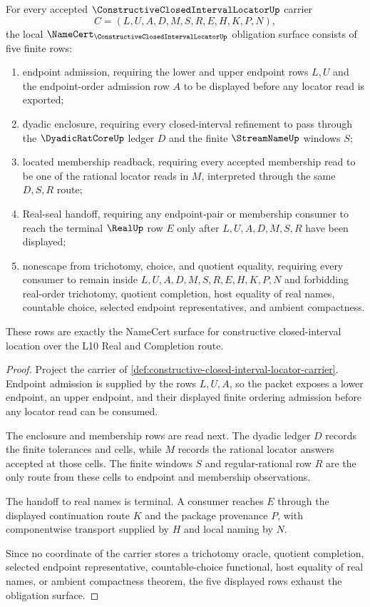 \begin{theorem}
\label{thm:constructive-closed-interval-locator-namecert-obligations}
For every accepted $\ConstructiveClosedIntervalLocatorUp$ carrier
$$
C=(L,U,A,D,M,S,R,E,H,K,P,N),
$$
the local $\NameCert_{\ConstructiveClosedIntervalLocatorUp}$ obligation surface consists of five finite rows:
\begin{enumerate}
\item endpoint admission, requiring the lower and upper endpoint rows $L,U$ and the endpoint-order admission row $A$ to be displayed before any locator read is exported;
\item dyadic enclosure, requiring every closed-interval refinement to pass through the $\DyadicRatCoreUp$ ledger $D$ and the finite $\StreamNameUp$ windows $S$;
\item located membership readback, requiring every accepted membership read to be one of the rational locator reads in $M$, interpreted through the same $D,S,R$ route;
\item Real-seal handoff, requiring any endpoint-pair or membership consumer to reach the terminal $\RealUp$ row $E$ only after $L,U,A,D,M,S,R$ have been displayed;
\item nonescape from trichotomy, choice, and quotient equality, requiring every consumer to remain inside $L,U,A,D,M,S,R,E,H,K,P,N$ and forbidding real-order trichotomy, quotient completion, host equality of real names, countable choice, selected endpoint representatives, and ambient compactness.
\end{enumerate}
These rows are exactly the NameCert surface for constructive closed-interval location over the L10 Real and Completion route.
\end{theorem}
\begin{proof}
Project the carrier of \autoref{def:constructive-closed-interval-locator-carrier}. Endpoint admission is supplied by the rows $L,U,A$, so the packet exposes a lower endpoint, an upper endpoint, and their displayed finite ordering admission before any locator read can be consumed.

The enclosure and membership rows are read next. The dyadic ledger $D$ records the finite tolerances and cells, while $M$ records the rational locator answers accepted at those cells. The finite windows $S$ and regular-rational row $R$ are the only route from these cells to endpoint and membership observations.

The handoff to real names is terminal. A consumer reaches $E$ through the displayed continuation route $K$ and the package provenance $P$, with componentwise transport supplied by $H$ and local naming by $N$.

Since no coordinate of the carrier stores a trichotomy oracle, quotient completion, selected endpoint representative, countable-choice functional, host equality of real names, or ambient compactness theorem, the five displayed rows exhaust the obligation surface.
\end{proof}

